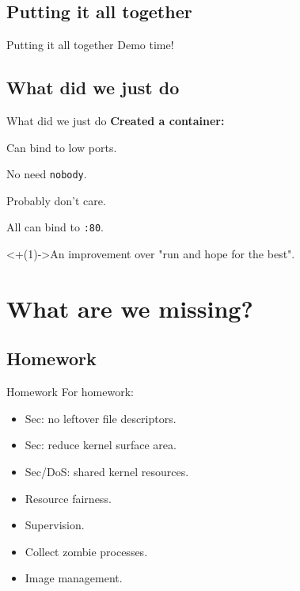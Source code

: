 \documentclass[14pt]{beamer}
\begin{document}
\subsection{Putting it all together}
\begin{frame}{Putting it all together}
    Demo time!
\end{frame}

\subsection{What did we just do}
\begin{frame}{What did we just do}
    \relax
    {\bf Created a container:}
    \begin{description}[<+(1)->]
        \item[Fake root] Can bind to low ports.
        \item[Isolated pids] No need {\tt nobody}.
        \item[Isolated mounts] Probably don't care.
        \item[Isolated network] All can bind to {\tt :80}.
    \end{description}
    \onslide<+(1)->{An improvement over "run and hope for the best".}
\end{frame}

\section{What are we missing?}
\subsection{Homework}
\begin{frame}{Homework}
    For homework:
    \begin{itemize}[<+(1)->]
        \item Sec: no leftover file descriptors.
        \item Sec: reduce kernel surface area.
        \item Sec/DoS: shared kernel resources.
        \item Resource fairness.
        \item Supervision.
        \item Collect zombie processes.
        \item Image management.
    \end{itemize}
\end{frame}
\end{document}

